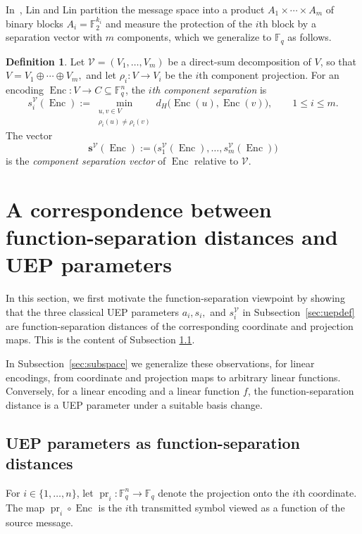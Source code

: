 \documentclass[a4paper,12pt]{article}
\theoremstyle{plain}
\theoremstyle{definition}
\newtheorem{definition}[lemma]{Definition}
\newcommand{\F}{\mathbb F}
\newcommand{\Enc}{\operatorname{Enc}}
\newcommand{\pr}{\operatorname{pr}}
\begin{document}
In~\cite{linlin1988}, Lin and Lin  partition the message space
into a product $A_1\times\cdots\times A_m$ of binary blocks
$A_i=\F_2^{k_i}$ and measure the protection of the $i$th block by a separation vector with $m$ components, which we generalize to $\F_q$ as follows.  
\begin{definition}
\label{def:component-separation}
Let $\mathcal V=(V_1,\dots,V_m)$ be a direct-sum decomposition of $V$, so that $ V=V_1\oplus\cdots\oplus V_m,$ and let $\rho_i\colon V\to V_i$ be the $i$th component projection.
For an encoding $\Enc\colon V\to C\subseteq\F_q^n$,
   the \emph{$i$th component separation} is
\[
s_i^{\mathcal V}(\Enc)
:=
\min_{\substack{u,v\in V\\
                 \rho_i(u)\neq\rho_i(v)}}
 d_H\bigl(\Enc(u),\Enc(v)\bigr),
\qquad 1\leq i\leq m.
\]
The vector
\[
\mathbf s^{\mathcal V}(\Enc)
:=
\bigl(s_1^{\mathcal V}(\Enc),\dots,
      s_m^{\mathcal V}(\Enc)\bigr)
\]
is the \emph{component  separation vector} of $\Enc$
relative to $\mathcal V$.
\end{definition}

 
 

\section{A correspondence between function-separation distances and UEP parameters}
\label{sec:fcc-uep}

In this section, we first motivate the function-separation viewpoint by showing that the three classical UEP parameters $a_i, s_i,$ and $s_i^\mathcal{V}$ in Subsection~\ref{sec:uepdef} are
function-separation distances of the corresponding coordinate and projection maps. This is the content of Subsection \ref{sec:dictionary}. 

In Subsection~\ref{sec:subspace} we generalize these observations, for linear encodings,  from coordinate and projection maps to arbitrary linear functions. Conversely, for a linear encoding and a linear function $f$, the function-separation distance is a UEP parameter under a suitable basis change. 


\subsection{UEP parameters as function-separation distances}
\label{sec:dictionary}

For $i\in\{1,\dots,n\}$, let $\pr_i\colon\F_q^n\to\F_q$ denote the projection onto the $i$th
coordinate. 
The map $\pr_i\circ\Enc$ is the $i$th transmitted symbol viewed as a function of
the source message.
 
\end{document}
